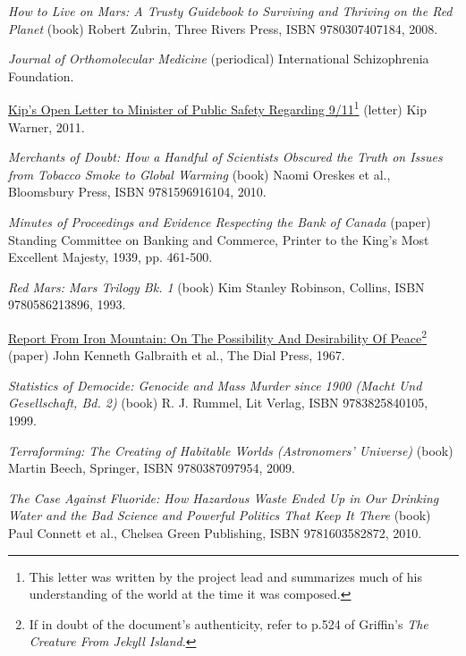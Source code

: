 \item
{\it How to Live on Mars: A Trusty Guidebook to Surviving and Thriving on the Red Planet} (book)\crlf
Robert Zubrin, Three Rivers Press, ISBN 9780307407184, 2008.

\item
{\it Journal of Orthomolecular Medicine} (periodical)\crlf
International Schizophrenia Foundation.

\item
\href{http://www.thevertigo.com/html/9-11/}{Kip's Open Letter to Minister of Public Safety Regarding 9/11}\footnote{This letter was written by the project lead and summarizes much of his understanding of the world at the time it was composed.} (letter)\crlf
Kip Warner, 2011.

\item
{\it Merchants of Doubt: How a Handful of Scientists Obscured the Truth on Issues from Tobacco Smoke to Global Warming} (book)\crlf
Naomi Oreskes et al., Bloomsbury Press, ISBN 9781596916104, 2010.

\item
{\it Minutes of Proceedings and Evidence Respecting the Bank of Canada} (paper)\crlf
Standing Committee on Banking and Commerce, Printer to the King's Most Excellent Majesty, 1939, pp. 461-500.

\item
{\it Red Mars: Mars Trilogy Bk. 1} (book)\crlf
Kim Stanley Robinson, Collins, ISBN 9780586213896, 1993.

\item
\href{http://www.teachpeace.com/Report_from_Iron_Mountain.pdf}{Report From Iron Mountain: On The Possibility And Desirability Of Peace}\footnote{If in doubt of the document's authenticity, refer to p.524 of Griffin's {\it The Creature From Jekyll Island}.} (paper)\crlf
John Kenneth Galbraith et al., The Dial Press, 1967.

\item
{\it Statistics of Democide: Genocide and Mass Murder since 1900 (Macht Und Gesellschaft, Bd. 2)} (book)\crlf
R. J. Rummel, Lit Verlag, ISBN 9783825840105, 1999.

\item
{\it Terraforming: The Creating of Habitable Worlds (Astronomers' Universe)} (book)\crlf
Martin Beech, Springer, ISBN 9780387097954, 2009.

\item
{\it The Case Against Fluoride: How Hazardous Waste Ended Up in Our Drinking Water and the Bad Science and Powerful Politics That Keep It There} (book)\crlf
Paul Connett et al., Chelsea Green Publishing, ISBN 9781603582872, 2010.

